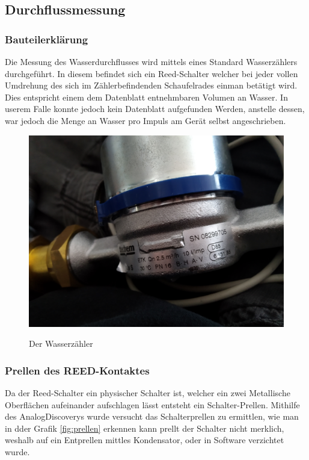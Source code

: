 \documentclass[12pt,a4paper,german]{article}
\begin{document}
	
\subsection{Durchflussmessung}

\subsubsection{Bauteilerklärung}

Die Messung des Wasserdurchflusses wird mittels eines Standard Wasserzählers
durchgeführt. In diesem befindet sich ein Reed-Schalter welcher bei jeder vollen
Umdrehung des sich im Zählerbefindenden Schaufelrades einman betätigt wird. Dies
entspricht einem dem Datenblatt entnehmbaren Volumen an Wasser. In userem Falle
konnte jedoch kein Datenblatt aufgefunden Werden, anstelle dessen, war jedoch
die Menge an Wasser pro Impuls am Gerät selbst angeschrieben.


	\begin{figure}[H]
		\centering
		\includegraphics[width=\textwidth]{pictures/wasserzaehler.jpg}
		\label{fig:counter_hw}
		\caption{Der Wasserzähler}
	\end{figure}

\subsubsection{Prellen des REED-Kontaktes}

Da der Reed-Schalter ein physischer Schalter ist, welcher ein zwei Metallische
Oberflächen aufeinander aufschlagen lässt entsteht ein Schalter-Prellen.
Mithilfe des AnalogDiscoverys wurde versucht das Schalterprellen zu ermittlen,
wie man in dder Grafik \ref{fig:prellen} erkennen kann prellt der Schalter
nicht merklich, weshalb auf ein Entprellen mittles Kondensator, oder in Software
verzichtet wurde.
\end{document}
